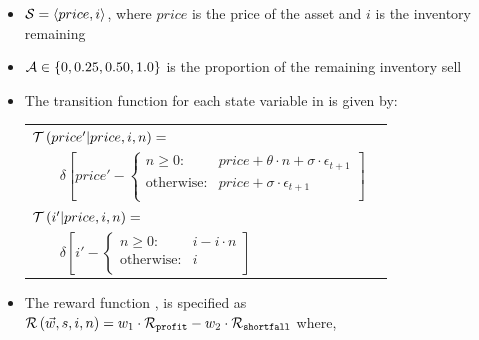 \begin{itemize}
    \item {\footnotesize $ \mathcal{S} = \left\langle price, i \right\rangle$}, where $ price $ is the price of the asset and $ i $ is the inventory remaining 
    \item {\footnotesize $ \mathcal{A} \in \left\lbrace 0, 0.25, 0.50, 1.0 \right\rbrace $} is the proportion of the remaining inventory sell
    \item The transition function {\footnotesize \Transition} for each state variable in {\footnotesize \State} is given by:    
    {\footnotesize 
        \abovedisplayskip=5pt
        \belowdisplayskip=0pt
        \renewcommand{\arraystretch}{1.5}
        \begin{tabular}{ll}
            $ \mathcal{T}\left( price' | price, i, n \right) = $ & $ $ \\
            $ \qquad \delta \left[ price' - \begin{cases}
            n \geq 0  : & price + \theta \cdot n + \sigma \cdot \epsilon_{t+1} \\
            \text{otherwise} : & price + \sigma \cdot \epsilon_{t+1} \\
            \end{cases} \right] $ & $ $\\            
            $ \mathcal{T}\left( i' | price, i, n \right) = $ & $ $ \\
            $ \qquad \delta \left[ i' - \begin{cases}
            n \geq 0 : & i - i \cdot n \\
            \text{otherwise} : & i \\
            \end{cases} \right] $ & $ $\\
        \end{tabular}
    }%
    \item The reward function {\footnotesize \Reward}, is specified as {\footnotesize $ \mathcal{R}\left(\vec{w}, s, i, n \right) = w_1 \cdot \mathcal{R}_{\mathtt{profit}} - w_2 \cdot \mathcal{R}_{\mathtt{shortfall}} $} where, \\
    {\footnotesize 
        \abovedisplayskip=10pt
        \belowdisplayskip=0pt
        \renewcommand{\arraystretch}{1.5}
        }
\end{itemize}
